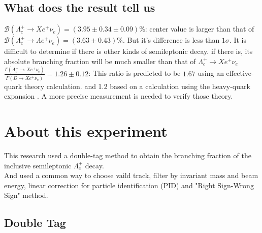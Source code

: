 \documentclass{beamer}
\begin{document}
\subsection{What does the result tell us}
\begin{frame}
    $\mathcal{B}(\Lambda_c^+ \rightarrow X e^+ \nu_e) = (3.95\pm0.34\pm0.09)\%$: center value is larger than that of $\mathcal{B}(\Lambda_c^+ \rightarrow \Lambda e^+ \nu_e)=(3.63 \pm 0.43)\%$. But it's difference is less than $1\sigma$.
    It is difficult to determine if there is other kinds of semileptonic decay. if there is, its absolute branching fraction will be much smaller than that of $\Lambda_c^+ \rightarrow X e^+ \nu_e$\\
    \vspace{0.2in}
    $\frac{\Gamma(\Lambda_c^+ \rightarrow X e^+ \nu_e)}{\bar{\Gamma}(D\rightarrow X e^+ \nu_e)}=1.26\pm0.12$: This ratio is predicted to be $1.67$ using an effective-quark theory calculation. \cite{gronau2011ratios} and 1.2 based on a calculation using the heavy-quark expansion \cite{manohar1994inclusive}.
    A more precise measurement is needed to verify those theory.
\end{frame}

\section{About this experiment}
\begin{frame}
    This research used a double-tag method to obtain the branching fraction of the inclusive semileptonic $\Lambda_c^+$ decay. \\
    \vspace{0.2in}
    And used a common way to choose vaild track, filter by invariant mass and beam energy, linear correction for particle identification (PID) and "Right Sign-Wrong Sign" method.
\end{frame}

\subsection{Double Tag}
\end{document}
